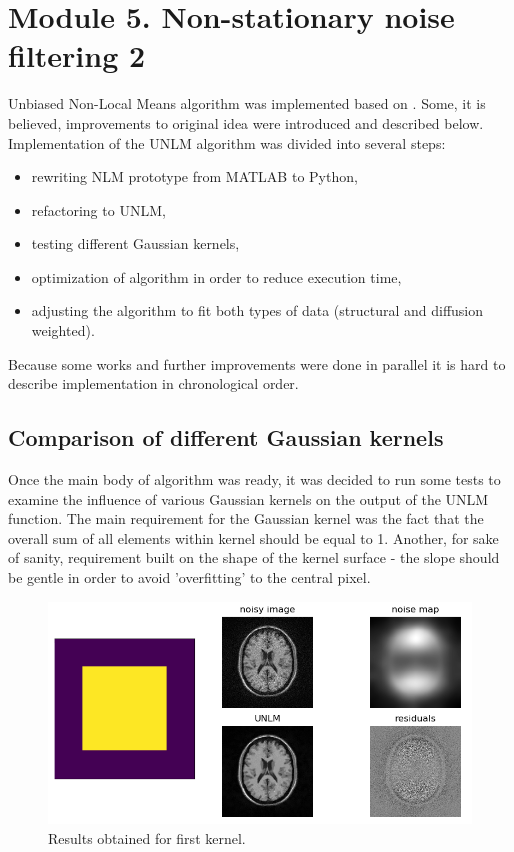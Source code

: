 \newpage
\section{Module 5. Non-stationary noise filtering 2}

Unbiased Non-Local Means algorithm was implemented based on \cite{5a1}. Some, it is believed, improvements to original idea were introduced and described below. Implementation of the UNLM algorithm was divided into several steps:
\begin{itemize}
	\item rewriting NLM prototype from MATLAB to Python,
	\item refactoring to UNLM,
	\item testing different Gaussian kernels,
	\item optimization of algorithm in order to reduce execution time,
	\item adjusting the algorithm to fit both types of data (structural and diffusion weighted).
\end{itemize}
Because some works and further improvements were done in parallel it is hard to describe implementation in chronological order.

\subsection*{Comparison of different Gaussian kernels}
Once the main body of algorithm was ready, it was decided to run some tests to examine the influence of various Gaussian kernels on the output of the UNLM function. The main requirement for the Gaussian kernel was the fact that the overall sum of all elements within kernel should be equal to 1. Another, for sake of sanity, requirement built on the shape of the kernel surface - the slope should be gentle in order to avoid 'overfitting' to the central pixel.


\begin{figure}[H]
	\centering{}
	\includegraphics[scale=0.7]{figures/module05/gk1results}
	\caption{Results obtained for first kernel.} 
\end{figure}

